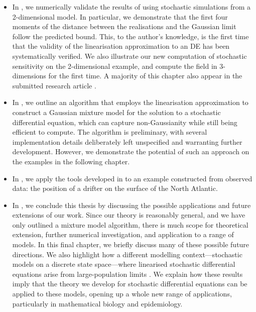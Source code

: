 \begin{itemize}
\begin{itemize}
	      \end{itemize}

	\item In , we numerically validate the results of  using stochastic simulations from a 2-dimensional model.
	      In particular, we demonstrate that the first four moments of the distance between the realisations and the Gaussian limit follow the predicted bound.
	      This, to the author's knowledge, is the first time that the validity of the linearisation approximation to an DE has been systematically verified.
	      We also illustrate our new computation of stochastic sensitivity on the 2-dimensional example, and compute the field in 3-dimensions for the first time.
	      A majority of this chapter also appear in the submitted research article \citep{BlakeEtAl_2023_ConvergenceStochasticDifferential}.

	\item In , we outline an algorithm that employs the linearisation approximation to construct a Gaussian mixture model for the solution to a stochastic differential equation, which can capture non-Gaussianity while still being efficient to compute.
	      The algorithm is preliminary, with several implementation details deliberately left unspecified and warranting further development.
	      However, we demonstrate the potential of such an approach on the examples in the following chapter.

	\item In , we apply the tools developed in  to an example constructed from observed data: the position of a drifter on the surface of the North Atlantic.

	\item In , we conclude this thesis by discussing the possible applications and future extensions of our work.
	      Since our theory is reasonably general, and we have only outlined a mixture model algorithm, there is much scope for theoretical extension, further numerical investigation, and application to a range of models.
	      In this final chapter, we briefly discuss many of these possible future directions.
	      We also highlight how a different modelling context---stochastic models on a discrete state space---where linearised stochastic differential equations arise from large-population limits \citep{Kurtz_1970_SolutionsOrdinaryDifferential,Kurtz_1971_LimitTheoremsSequences}.
	      We explain how these results imply that the theory we develop for stochastic differential equations can be applied to these models, opening up a whole new range of applications, particularly in mathematical biology and epidemiology.




\end{itemize}



